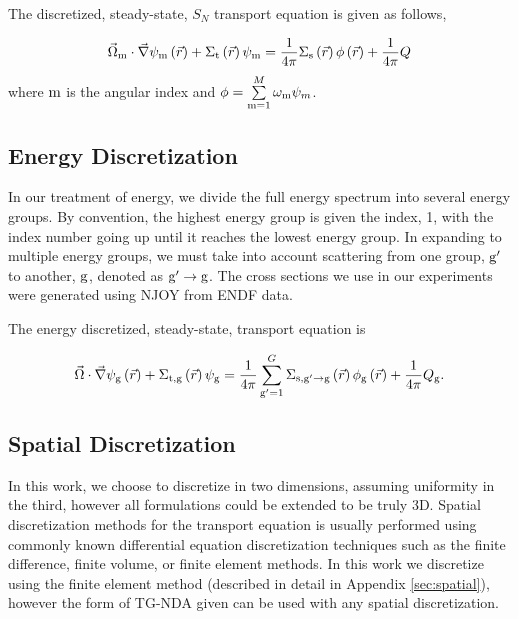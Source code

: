 The discretized, steady-state, $S_N$ transport equation is given as follows,

 \begin{equation}
  \vec{\Omega}_{\mathrm{m}} \cdot \vec{\nabla} \psi_{\mathrm{m}} \left(\vec{r}\right)+ \Sigma_{\mathrm{t}}\left(\vec{r}\right)\psi_{\mathrm{m}} = \frac{1}{4 \pi} \Sigma_{\mathrm{s}}\left(\vec{r}\right) \phi\left(\vec{r}\right) + \frac{1}{4 \pi} Q
  \label{eq:transport-angular}
 \end{equation}
where $\mathrm{m}$ is the angular index and $\phi = \sum\limits_{\mathrm{m}=1}^M \omega_{\mathrm{m}} \psi_m$.

\subsection{Energy Discretization}
In our treatment of energy, we divide the full energy spectrum into several energy groups. By convention, the highest energy group is given the index, 1, with the index number going up until it reaches the lowest energy group. In expanding to multiple energy groups, we must take into account scattering from one group, $\mathrm{g}'$ to another, $\mathrm{g}$, denoted as $\mathrm{g}' \rightarrow \mathrm{g} $. The cross sections we use in our experiments were generated using NJOY from ENDF data.

The energy discretized, steady-state, transport equation is

 \begin{equation}
  \vec{\Omega} \cdot \vec{\nabla} \psi_{\mathrm{g}} \left(\vec{r}\right)+ \Sigma_{\mathrm{t}, \mathrm{g}}\left(\vec{r}\right)\psi_{\mathrm{g}} = \frac{1}{4 \pi} \sum\limits_{\mathrm{g}'=1}^{G}\Sigma_{\mathrm{s}, \mathrm{g}' \rightarrow \mathrm{g}}\left(\vec{r}\right) \phi_{\mathrm{g}}\left(\vec{r}\right) + \frac{1}{4 \pi} Q_{\mathrm{g}}.
  \label{eq:transport-energy}
 \end{equation}


\subsection{Spatial Discretization}
In this work, we choose to discretize in two dimensions, assuming uniformity in the third, however all formulations could be extended to be truly 3D. Spatial discretization methods for the transport equation is usually performed using commonly known differential equation discretization techniques such as the finite difference, finite volume, or finite element methods. In this work we discretize using the finite element method (described in detail in Appendix \ref{sec:spatial}), however the form of TG-NDA given can be used with any spatial discretization. 



